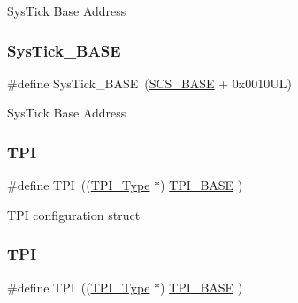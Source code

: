 Sys\+Tick Base Address \mbox{\label{group___c_m_s_i_s__core__base_ga58effaac0b93006b756d33209e814646}} 
\subsubsection{\texorpdfstring{Sys\+Tick\+\_\+\+B\+A\+SE}{SysTick\_BASE}\hspace{0.1cm}{\footnotesize\ttfamily [7/7]}}
{\footnotesize\ttfamily \#define Sys\+Tick\+\_\+\+B\+A\+SE~(\mbox{\hyperlink{group___c_m_s_i_s__core__base_ga3c14ed93192c8d9143322bbf77ebf770}{S\+C\+S\+\_\+\+B\+A\+SE}} +  0x0010\+U\+L)}

Sys\+Tick Base Address \mbox{\label{group___c_m_s_i_s__core__base_ga8b4dd00016aed25a0ea54e9a9acd1239}} 
\subsubsection{\texorpdfstring{T\+PI}{TPI}\hspace{0.1cm}{\footnotesize\ttfamily [1/4]}}
{\footnotesize\ttfamily \#define T\+PI~((\mbox{\hyperlink{struct_t_p_i___type}{T\+P\+I\+\_\+\+Type}}       $\ast$)     \mbox{\hyperlink{group___c_m_s_i_s__core__base_ga2b1eeff850a7e418844ca847145a1a68}{T\+P\+I\+\_\+\+B\+A\+SE}}      )}

T\+PI configuration struct \mbox{\label{group___c_m_s_i_s__core__base_ga8b4dd00016aed25a0ea54e9a9acd1239}} 
\subsubsection{\texorpdfstring{T\+PI}{TPI}\hspace{0.1cm}{\footnotesize\ttfamily [2/4]}}
{\footnotesize\ttfamily \#define T\+PI~((\mbox{\hyperlink{struct_t_p_i___type}{T\+P\+I\+\_\+\+Type}}       $\ast$)     \mbox{\hyperlink{group___c_m_s_i_s__core__base_ga2b1eeff850a7e418844ca847145a1a68}{T\+P\+I\+\_\+\+B\+A\+SE}}      )}

